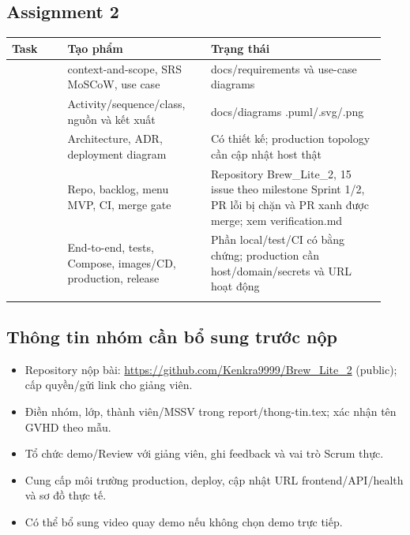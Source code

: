\documentclass[a4paper,12pt,oneside]{report}
\begin{document}
\subsection{Assignment 2}
\begingroup\fontsize{9}{11}\selectfont\setlength{\tabcolsep}{3pt}\renewcommand{\arraystretch}{1.35}
\begin{longtable}{@{}>{\raggedright\arraybackslash}p{0.14\linewidth} >{\raggedright\arraybackslash}p{0.36\linewidth} >{\raggedright\arraybackslash}p{0.44\linewidth}@{}}
\toprule
\textbf{Task} & \textbf{Tạo phẩm} & \textbf{Trạng thái} \\
\midrule\endhead
1 & context-and-scope, SRS MoSCoW, use case & docs/\allowbreak{}requirements và use-case diagrams \\
\addlinespace[2pt]
2 & Activity/\allowbreak{}sequence/\allowbreak{}class, nguồn và kết xuất & docs/\allowbreak{}diagrams .puml/\allowbreak{}.svg/\allowbreak{}.png \\
\addlinespace[2pt]
3 & Architecture, ADR, deployment diagram & Có thiết kế; production topology cần cập nhật host thật \\
\addlinespace[2pt]
4 & Repo, backlog, menu MVP, CI, merge gate & Repository Brew\_Lite\_2, 15 issue theo milestone Sprint 1/\allowbreak{}2, PR lỗi bị chặn và PR xanh được merge; xem verification.md \\
\addlinespace[2pt]
5 & End-to-end, tests, Compose, images/\allowbreak{}CD, production, release & Phần local/\allowbreak{}test/\allowbreak{}CI có bằng chứng; production cần host/\allowbreak{}domain/\allowbreak{}secrets và URL hoạt động \\
\addlinespace[2pt]
\bottomrule\end{longtable}\endgroup

\subsection{Thông tin nhóm cần bổ sung trước nộp}
\begin{itemize}
\item Repository nộp bài: \url{https://github.com/Kenkra9999/Brew_Lite_2} (public); cấp quyền/\allowbreak{}gửi link cho giảng viên.
\item Điền nhóm, lớp, thành viên/\allowbreak{}MSSV trong report/\allowbreak{}thong-tin.tex; xác nhận tên GVHD theo mẫu.
\item Tổ chức demo/\allowbreak{}Review với giảng viên, ghi feedback và vai trò Scrum thực.
\item Cung cấp môi trường production, deploy, cập nhật URL frontend/\allowbreak{}API/\allowbreak{}health và sơ đồ thực tế.
\item Có thể bổ sung video quay demo nếu không chọn demo trực tiếp.
\end{itemize}
\end{document}
